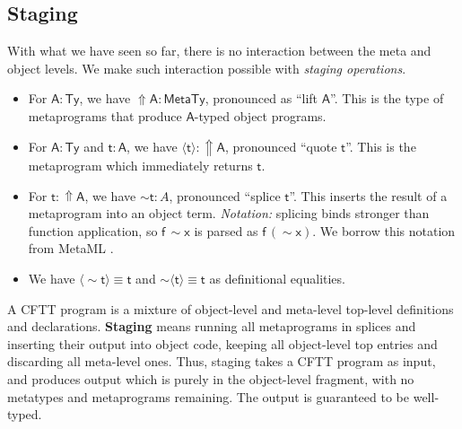 \documentclass[acmsmall,screen,review,anonymous]{acmart}
\newcommand{\msf}[1]{{\mathsf{#1}}}
\newcommand{\bs}[1]{\boldsymbol{#1}}
\newcommand{\vA}{\mathsf{A}}
\newcommand{\vx}{\mathsf{x}}
\newcommand{\vf}{\mathsf{f}}
\newcommand{\vt}{\mathsf{t}}
\newcommand{\Lift}{{\Uparrow}}
\newcommand{\spl}{{\bs{\sim}}}
\newcommand{\ql}{{\bs{\langle}}}
\newcommand{\qr}{{\bs{\rangle}}}
\newcommand{\MTy}{\msf{MetaTy}}
\newcommand{\Ty}{\msf{Ty}}
\theoremstyle{remark}
\begin{document}

\subsection{Staging}\label{sec:staging}

With what we have seen so far, there is no interaction between the meta and
object levels. We make such interaction possible with \emph{staging operations}.

\begin{itemize}
\item For $\vA : \Ty$, we have $\Lift \vA : \MTy$, pronounced as ``lift $\vA$''. This is
      the type of metaprograms that produce $\vA$-typed object programs.
\item For $\vA : \Ty$ and $\vt : \vA$, we have $\ql \vt \qr : \Lift \vA$, pronounced ``quote $\vt$''. This
      is the metaprogram which immediately returns $\vt$.
\item For $\vt : \Lift \vA$, we have $\spl \vt : A$, pronounced ``splice
  $\vt$''. This inserts the result of a metaprogram into an object
  term. \emph{Notation:} splicing binds stronger than function application, so
  $\vf\,\spl \vx$ is parsed as $\vf\,(\spl \vx)$. We borrow this notation from
  MetaML \cite{metaml}.
\item We have $\ql \spl \vt \qr \equiv \vt$ and $\spl \ql \vt \qr \equiv \vt$ as definitional equalities.
\end{itemize}

A CFTT program is a mixture of object-level and meta-level top-level definitions
and declarations. \textbf{Staging} means running all metaprograms in splices and
inserting their output into object code, keeping all object-level top entries
and discarding all meta-level ones. Thus, staging takes a CFTT program as input,
and produces output which is purely in the object-level fragment, with no
metatypes and metaprograms remaining. The output is guaranteed to be well-typed.
\end{document}
